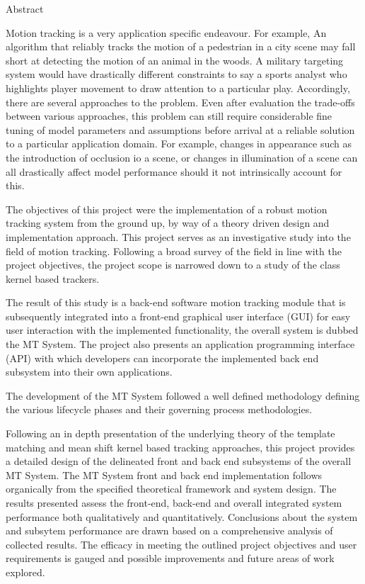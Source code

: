 \begin{centerpage}{Abstract}
 
Motion tracking is a very application specific endeavour. For example, An
    algorithm that reliably tracks the motion of a pedestrian in a city scene may fall
    short at detecting the motion of an animal in the woods. A military targeting
    system would have drastically different constraints to say a sports analyst
    who highlights player movement to draw attention to a particular play.
    Accordingly, there are several approaches to the problem. Even after evaluation
    the trade-offs between various approaches, this problem can still require
    considerable fine tuning of model parameters and assumptions before arrival at a
    reliable solution to a particular application domain. 
    For example, changes in appearance such as the introduction of occlusion io a scene, or changes in
    illumination of a scene can all drastically affect model performance should it
    not intrinsically account for this.

The objectives of this project were the implementation of a robust motion
    tracking system from the ground up, by way of a theory driven design and
    implementation approach. 
    This project serves as an investigative study into the field of motion tracking.
    Following a broad survey of the field in line with the project objectives,
    the project scope is narrowed down to a study of the class kernel based
    trackers.
    
The result of this study is a back-end software motion tracking module that
    is subsequently integrated into a front-end graphical user interface (GUI) for easy
    user interaction with the implemented functionality, the overall system is
    dubbed the MT System. 
    The project also presents an application programming interface (API) with which developers can incorporate the
    implemented back end subsystem into their own applications.

The development of the MT System followed a well defined methodology defining the various
    lifecycle phases and their governing process methodologies. 

Following an in depth presentation of the underlying theory of the template matching
    and mean shift kernel based tracking approaches, this project provides a
    detailed design of the delineated front and back end subsystems of the
    overall MT System. 
    The MT System front and back end implementation follows organically from the
    specified theoretical framework and system design. The results presented assess
    the front-end, back-end and overall integrated system performance both qualitatively and
    quantitatively. Conclusions about the system and subsytem performance are drawn based on a comprehensive
    analysis of collected results. The efficacy in meeting the outlined project
    objectives and user requirements is gauged and possible improvements and
    future areas of work explored.




\end{centerpage}
